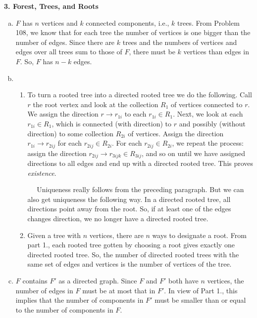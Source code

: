 \documentclass[11pt]{article}
\begin{document}
\newpage




\noindent \textbf{3. Forest, Trees, and Roots}

\begin{enumerate}[(a)]
	\item $F$ has $n$ vertices and $k$ connected components, i.e., $k$ trees. From Problem 108, we know that for each tree the number of vertices is one bigger than the number of edges. Since there are $k$ trees and the numbers of vertices and edges over all trees sum to those of $F$, there must be $k$ vertices than edges in $F$. So, $F$ has $\boxed{n-k}$ edges.
	
	
	\item 
	\begin{enumerate}[1.]
		\item To turn a rooted tree into a directed rooted tree we do the following. Call $r$ the root vertex and look at the collection $R_1$ of vertices connected to $r$. We assign the direction $r\to r_{1i}$ to each $r_{1i}\in R_1$. Next, we look at each $r_{1i}\in R_1$, which is connected (with direction) to $r$ and possibly (without direction) to some  collection $R_{2i}$ of vertices. Assign the direction $r_{1i}\to r_{2ij}$ for each $r_{2ij}\in R_{2i}$. For each $r_{2ij}\in R_{2i}$, we repeat the process: assign the direction $r_{2ij}\to r_{3ijk}\in R_{3ij}$, and so on until we have assigned directions to all edges and end up with a directed rooted tree. This proves \textit{existence}. 
		
		\indent $\quad$ Uniqueness really follows from the preceding paragraph. But we can also get uniqueness the following way. In a directed rooted tree, all directions point away from the root. So, if at least one of the edges changes direction, we no longer have a directed rooted tree. 
		
		\item Given a tree with $n$ vertices, there are $n$ ways to designate a root. From part 1., each rooted tree gotten by choosing a root gives exactly one directed rooted tree. So, the number of directed rooted trees with the same set of edges and vertices is the $\boxed{\text{number of vertices of the tree.}}$
	\end{enumerate}

	\item $F$ contains $F'$ as a directed graph. Since $F$ and $F'$ both have $n$ vertices, the number of edges in $F$ must be at most that in $F'$. In view of Part 1., this implies that the number of components in $F'$ must be smaller than or equal to the number of components in $F$. 
	

\end{enumerate}
\end{document}
